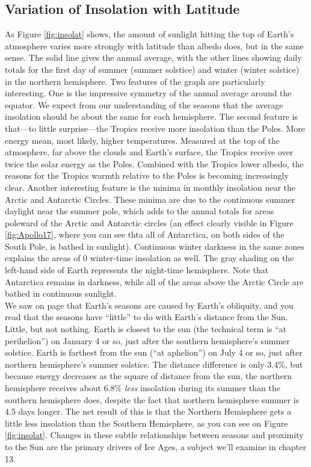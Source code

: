 \documentclass[amstex,12pt]{book}
\begin{document}
\subsection{Variation of Insolation with Latitude}
As Figure \ref{fig:insolat} shows, the amount of sunlight hitting the top of Earth's atmosphere varies more strongly with latitude than albedo does, but in the same sense. The solid line gives the annual average, with the other lines showing daily totals for the first day of summer (summer solstice) and winter (winter solstice) in the northern hemisphere. Two features of the graph are particularly interesting. One is the impressive symmetry of the annual average around the equator. We expect from our understanding of the seasons that the average insolation should be about the same for each hemisphere. The second feature is that---to little surprise---the Tropics receive more insolation than the Poles. More energy mean, most likely, higher temperatures. Measured at the top of the atmosphere, far above the clouds and Earth’s surface, the Tropics receive over twice the solar energy as the Poles. Combined with the Tropics lower albedo, the reasons for the Tropics warmth relative to the Poles is becoming increasingly clear. Another interesting feature is the minima in monthly insolation near the Arctic and Antarctic Circles. These minima are due to the continuous summer daylight near the summer pole, which adds to the annual totals for areas poleward of the Arctic and Antarctic circles (an effect clearly visible in Figure \ref{fig:Apollo17}, where you can see thta all of Antarctica, on both sides of the South Pole, is bathed in sunlight). Continuous winter darkness in the same zones explains the areas of 0 winter-time insolation as well. The gray shading on the left-hand side of Earth represents the night-time hemisphere. Note that Antarctica remains in darkness, while all of the areas above the Arctic Circle are bathed in continuous sunlight.\\ 
We saw on page \pageref{distance_cite} that Earth's seasons are caused by Earth's obliquity, and you read that the seasons have ``little'' to do with Earth's distance from the Sun. Little, but not nothing. Earth is closest to the sun (the technical term is ``at perihelion'') on January 4 or so, just after the southern hemisphere’s summer solstice. Earth is farthest from the sun (``at aphelion'') on July 4 or so, just after northern hemisphere’s summer solstice. The distance difference is only 3.4\%, but because energy decreases as the square of distance from the sun, the northern hemisphere receives about 6.8\% \emph{less} insolation during its summer than the southern hemisphere does, despite the fact that northern hemisphere summer is 4.5 days longer. The net result of this is that the Northern Hemisphere gets a little less insolation than the Southern Hemisphere, as you can see on Figure \ref{fig:insolat}. Changes in these subtle relationships between seasons and proximity to the Sun are the primary drivers of Ice Ages, a subject we'll examine in chapter 13.\\
  
\end{document}
